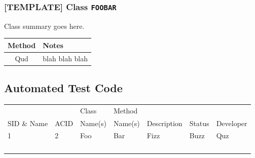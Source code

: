 \documentclass[11pt]{article}
\begin{document}
\subsubsection*{[TEMPLATE] Class \texttt{FOOBAR}}
\label{sec:orgcd7d943}
Class summary goes here.

\begin{center}
\begin{tabular}{|c|l|}
Method & Notes\\
\hline
Qud & blah blah blah\\
\end{tabular}
\end{center}

\subsection{Automated Test Code}
\label{sec:org8422ced}

\begin{center}
\begin{tabular}{|l|l|p{2.5cm}|p{2.5cm}|p{2.5cm}|l|l|}
 &  & Class & Method &  &  & \\
SID \& Name & ACID & Name(s) & Name(s) & Description & Status & Developer\\
\hline
1 & 2 & Foo & Bar & Fizz & Buzz & Quz\\
 &  &  &  &  &  & \\
 &  &  &  &  &  & \\
 &  &  &  &  &  & \\
 &  &  &  &  &  & \\
\end{tabular}
\end{center}
\end{document}

